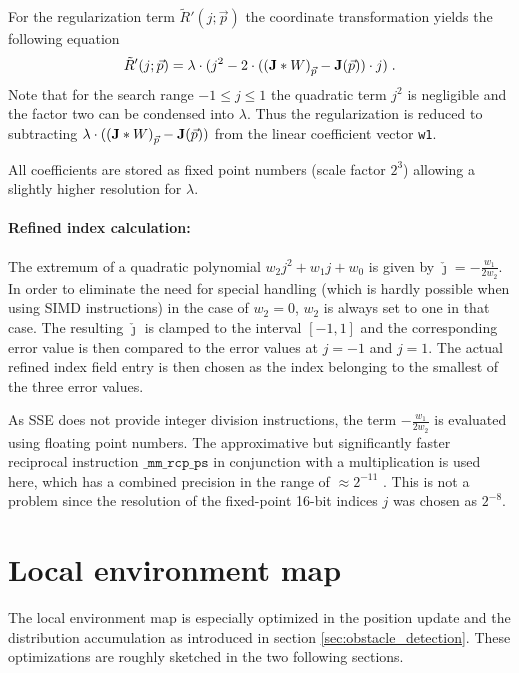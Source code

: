 For the regularization term $\tilde R'(j; \vec p)$ the coordinate transformation yields the following equation
$$\tilde R'(j; \vec p) = \lambda \cdot (j^2 - 2 \cdot (\left(\img{J} \ast W\right)_{\vec p} - \img{J}(\vec p)) \cdot j) \; .$$
Note that for the search range $-1 \leq j \leq 1$ the quadratic term $j^2$ is negligible and the factor two can be condensed into $\lambda$. Thus the regularization is reduced to subtracting $\lambda \cdot (\left(\img{J} \ast W\right)_{\vec p} - \img{J}(\vec p))$ from the linear coefficient vector \texttt{w1}.

All coefficients are stored as fixed point numbers (scale factor $2^3$) allowing a slightly higher resolution for $\lambda$.

\paragraph{Refined index calculation:} The extremum of a quadratic polynomial $w_2 j^2 + w_1 j + w_0$ is given by $\check \jmath = - \frac{w_1}{2 w_2}$. In order to eliminate the need for special handling (which is hardly possible when using SIMD instructions) in the case of $w_2 = 0$, $w_2$ is always set to one in that case. The resulting $\check \jmath$ is clamped to the interval $[-1, 1]$ and the corresponding error value is then compared to the error values at $j = -1$ and $j = 1$. The actual refined index field entry is then chosen as the index belonging to the smallest of the three error values.

As SSE does not provide integer division instructions, the term $-\frac{w_1}{2 w_2}$ is evaluated using floating point numbers. The approximative but significantly faster reciprocal instruction $\texttt{\_mm\_rcp\_ps}$ in conjunction with a multiplication is used here, which has a combined precision in the range of $\approx 2^{-11}$ \citep[chapter 11.12 ``divide and square root operations'', p. 417ff.]{IntelOptimizationHandbook}. This is not a problem since the resolution of the fixed-point 16-bit indices $j$ was chosen as $2^{-8}$.


\section{Local environment map}

The local environment map is especially optimized in the position update and the distribution accumulation as introduced in section \ref{sec:obstacle_detection}. These optimizations are roughly sketched in the two following sections.

